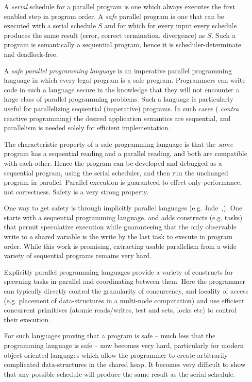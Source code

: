 A {\em serial} schedule for a parallel program is one which always
executes the first enabled step in program order. A {\em safe}
parallel program is one that can be executed with a serial schedule
$S$ and for which for every input every schedule produces the same
result (error, correct termination, divergence) as $S$.  Such a
program is semantically a sequential program, hence it is
scheduler-determinate and deadlock-free.

A {\em safe parallel programming language} is an imperative parallel
programming language in which every legal program is a safe
program. Programmers can write code in such a language secure in the
knowledge that they will not encounter a large class of parallel
programming problems. Such a language is particularly useful for
parallelizing sequential (imperative) programs. In such cases ({\em
  contra} reactive programming) the desired application semantics are
sequential, and parallelism is needed solely for efficient
implementation.

The characteristic property of a safe programming language is that the
{\em same} program has a sequential reading and a parallel reading,
and both are compatible with each other. Hence the program can be
developed and debugged as a sequential program, using the serial
scheduler, and then run the unchanged program in parallel.  Parallel
execution is guaranteed to effect only performance, not
correctness. Safety is a very strong property.

One way to get safety is through implicitly parallel languages (e.g.{}
Jade~\cite{Rinard98thedesign},\cite{vonPraun:2007:IPO:1229428.1229443}). One
starts with a sequential programming language, and adds constructs
(e.g.{} tasks) that permit speculative execution while guaranteeing
that the only observable write to a shared variable is the write by
the last task to execute in program order.  While this work is
promising, extracting usable parallelism from a wide variety of
sequential programs remains very hard.

Explicitly parallel programming languages provide a variety of
constructs for spawning tasks in parallel and coordinating between
them. Here the programmer can typically directly control the
granularity of concurrency, and locality of access (e.g. placement of
data-structures in a multi-node computation) and use efficient
concurrent primitives (atomic reads/writes, test and sets, locks etc)
to control their execution.

For such languages proving that a program is safe -- much less that
the programming language is safe -- now becomes very hard,
particularly for modern object-oriented languages which allow the
programmer to create arbitrarily complicated data-structures in the
shared heap. It becomes very difficult to show that any possible
schedule will produce the same result as the serial schedule.

